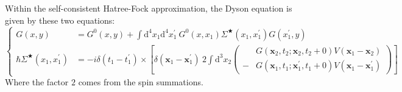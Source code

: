 Within the self-consistent Hatree-Fock approximation, the Dyson equation is given by these two equations:
\[ \left \{ \begin{split}
G(x,y)&= G^{0}(x,y) + \int \mathrm{d}^{4}x_{1} \mathrm{d}^{4}x_{1}^{'} \ G^{0}(x,x_{1}) \Sigma^{\bigstar}%
(x_{1},x_{1}^{'})G(x_{1}^{'},y)\\
\hbar \Sigma^{\bigstar}
(x_{1},x_{1}^{'})&= -i \delta(t_{1}-t_{1}^{'}) \times 
\left[ \delta(\mathbf{x}_{1}-\mathbf{x}_{1}^{'}) \ 2 \int \mathrm{d}^{3}x_{2} \left( \begin{split} &G(\mathbf{x}_{2},t_{2};\mathbf{x}_{2},t_{2}+0) V(\mathbf{x}_{1}-\mathbf{x}_{2}) 
\\- &G(\mathbf{x}_{1},t_{1};\mathbf{x}_{1}^{'},t_{1}+0) V(\mathbf{x}_{1}-\mathbf{x}_{1}^{'}) \end{split}\right)
\right]
\end{split}\right. \]
Where the factor $2$ comes from the spin summations.

